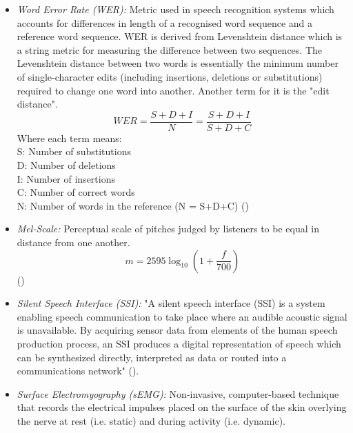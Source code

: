 \begin{itemize}
  \item \emph{Word Error Rate (WER):}
  Metric used in speech recognition systems which accounts for differences in length of
  a recognised word sequence and a reference word sequence. WER is derived from
  Levenshtein distance  which is a string metric for measuring the difference between two
  sequences. The Levenshtein distance between two words is essentially the minimum number of
  single-character edits (including insertions, deletions or substitutions) required to
  change one word into another. Another term for it is the "edit distance".
  \[
    WER
    = \dfrac{S + D + I}{N}
    = \dfrac{S + D + I}{S + D + C}
  \]
  Where each term means:\\
  S: Number of substitutions\\
  D: Number of deletions\\
  I: Number of insertions\\
  C: Number of correct words\\
  N: Number of words in the reference (N = S+D+C)
  (\cite{1966SPhD...10..707L})
  \item \emph{Mel-Scale:}
  Perceptual scale of pitches judged by listeners to be equal in distance from one another.
  \[ m = 2595 \log_{10} \left(1 + \dfrac{f}{700}\right) \]
  (\cite{mel_scale_formula})
  \item \emph{Silent Speech Interface (SSI):}
  "A silent speech interface (SSI) is a system enabling speech communication to take
  place where an audible acoustic signal is unavailable. By acquiring sensor data from
  elements of the human speech production process, an SSI produces a digital representation
  of speech which can be synthesized directly, interpreted as data or routed into a communications
  network" (\cite{ssi_definition}).
  \iffalse
  \item \emph{Mel-Frequency Cepstrum Co-efficient (MFCCs):}
  Representation of the short-term power spectrum of a sound, based on a linear cosine transform
  \fi
  \item \emph{Surface Electromyography (sEMG):}
  Non-invasive, computer-based technique that records the electrical impulses placed on the surface
  of the skin overlying the nerve at rest (i.e. static) and during activity (i.e. dynamic).
  \iffalse
  \item \emph{n-gram:}
  "An n-gram is a contiguous sequence of \textit{n} items from a given sample of text or speech"
  (\cite{n_gram_def}). Each item can be a phoneme, syllable, letter, word or other common token
  used in speech applications such as byte-pair encoding where the most common pair of consecutive
  bytes of data is replaced with a byte which doesn't occur within the data.
  \fi
\end{itemize}


